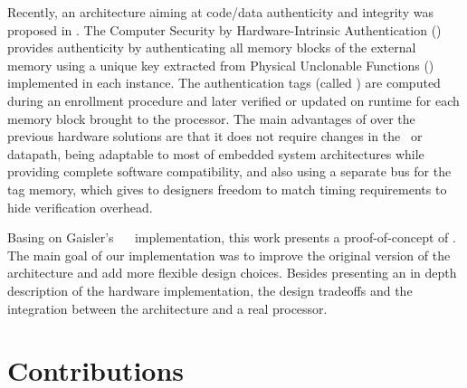 Recently, an architecture aiming at code/data authenticity and integrity was proposed in \cite{Hoffman2015}. The Computer Security by Hardware-Intrinsic Authentication (\cshia) provides authenticity by authenticating all memory blocks of the external memory using a unique key extracted from Physical Unclonable Functions (\pufs) implemented in each instance. The authentication tags (called \ptags) are computed during an enrollment procedure and later verified or updated on runtime for each memory block brought to the processor. The main advantages of \cshia over the previous hardware solutions are that it does not require changes in the \isa~or datapath, being adaptable to most of embedded system architectures while providing complete software compatibility, and also using a separate bus for the tag memory, which gives to designers freedom to match timing requirements to hide verification overhead.

Basing on Gaisler's \leon~\cite{Leon} \fpga~implementation, this work presents a proof-of-concept of \cshia. The main goal of our implementation was to improve the original version of the architecture and add more flexible design choices. Besides presenting an in depth description of the hardware implementation, the design tradeoffs and the integration between the architecture and a real processor.





\section{Contributions}
\label{sec:contributions}
\lorenipsuns

